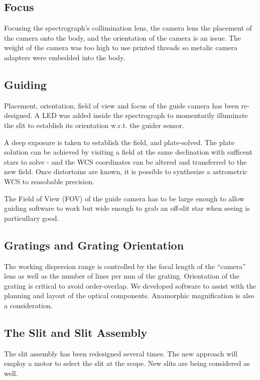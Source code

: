 \documentclass[letter,11pt,oneside]{article}
\begin{document}
\subsection{Focus}

Focusing the spectrograph's collimination lens, the camera lens
the placement of the camera onto the body, and the orientation
of the camera is an issue. The weight of the camera was too high
to use printed threads so metalic camera adapters were embedded
into the body.


\subsection{Guiding}

Placement, orientation, field of view and focus of the guide
camera has been re-designed. A LED was added inside the
spectrograph to momentarily illuminate the slit to establish
its orientation w.r.t. the guider sensor.

A deep exposure is taken to establish the field, and plate-solved.
The plate solution can be achieved by visiting a field at the
same declination with sufficent stars to solve - and the
WCS coordinates can be altered and transferred to the new
field. Once distortoins are known, it is possible to synthesize
a astrometric WCS to reasobable precision.

The Field of View (FOV) of the guide camera has to be large
enough to allow guiding software to work but wide enough
to grab an off-slit star when seeing is particullary good.

\subsection{Gratings and Grating Orientation}

The working dispersion range is controlled by the focal length
of the ``camera'' lens as well as the number of lines per
mm of the grating. Orientation of the grating is critical
to avoid order-overlap. We developed software to assist
with the planning and layout of the optical components.
Anamorphic magnification is also a consideration.

\subsection{The Slit and Slit Assembly}

The slit assembly has been redesigned several times. The new
approach will employ a motor to select the slit at the scope.
New slits are being considered as well.
\end{document}
